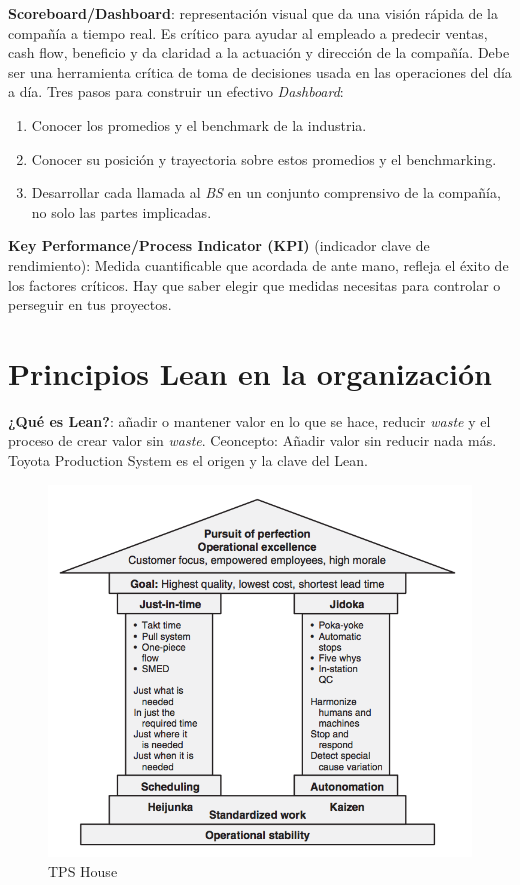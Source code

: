 \documentclass[]{article}
\begin{document}
\textbf{Scoreboard/Dashboard}: representación visual que da una visión rápida de la compañía a tiempo real. Es crítico para ayudar al empleado a predecir ventas, cash flow, beneficio y da claridad a la actuación y dirección de la compañía. Debe ser una herramienta crítica de toma de decisiones usada en las operaciones del día a día. Tres pasos para construir un efectivo \textit{Dashboard}: \begin{enumerate} \item Conocer los promedios y el benchmark de la industria. \item Conocer su posición y trayectoria sobre estos promedios y el benchmarking. \item Desarrollar cada llamada al \textit{BS} en un conjunto comprensivo de la compañía, no solo las partes implicadas. \end{enumerate}

\textbf{Key Performance/Process Indicator (KPI)} (indicador clave de rendimiento): Medida cuantificable que acordada de ante mano, refleja el éxito de los factores críticos. Hay que saber elegir que medidas necesitas para controlar o perseguir en tus proyectos. 

\section{Principios Lean en la organización}

\textbf{¿Qué es Lean?}: añadir o mantener valor en lo que se hace, reducir \textit{waste} y el proceso de crear valor sin \textit{waste}. Ceoncepto: Añadir valor sin reducir nada más. Toyota Production System es el origen y la clave del Lean. 

\begin{figure}[ht!]
	\centering
	\includegraphics[width=120mm]{imagenes/TPSHouse.png}
	\caption{TPS House}
	\label{fig:TPS House}
\end{figure}
\end{document}
